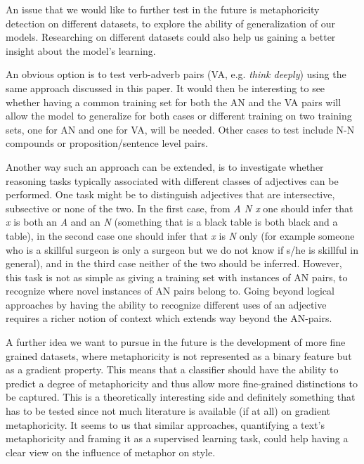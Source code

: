 An issue that we would like to further test in the future is metaphoricity detection on different datasets, to explore the ability of generalization of our models. Researching on different datasets could also help us gaining a better insight about the model's learning.  

An obvious option is to test verb-adverb pairs (VA, e.g. \textit{think deeply}) using the same approach discussed in this paper. It would then be interesting to see whether having a common training set for both the AN and the VA pairs will allow the model to generalize for both cases or different training on two training sets, one for AN and one for VA, will be needed. Other cases to test include N-N compounds or proposition/sentence level pairs. 


Another way such an approach can be extended, is to investigate  whether reasoning tasks typically associated with different classes of adjectives can be performed. One task might be to distinguish adjectives that are intersective, subsective or none of the two. In the first case, from\textit{ A N x} one should infer that \textit{x} is both an \textit{A} and an \textit{N} (something that is a black table is both black and a table), in the second case one should infer that \textit{x} is \textit{N} only (for example someone who is a skillful surgeon is only a surgeon but we do not know if s/he is skillful in general), and in the third case neither of the two should be inferred. 
However, this task is not as simple as giving a training set with instances of AN pairs, to recognize  where novel instances of AN pairs belong to. 
Going beyond logical approaches by having the ability to recognize different uses of an adjective requires a richer notion of context which extends way beyond the AN-pairs. %


A further idea we want to pursue in the future is the development of more fine grained datasets, where metaphoricity is not represented as a binary feature but as a gradient property. This means that a classifier should have the ability to predict a degree of metaphoricity and thus allow more fine-grained distinctions to be captured. This is a theoretically interesting side and definitely something that has to be tested since not much literature is available (if at all) on gradient metaphoricity.  It seems to us that similar approaches, quantifying a text's metaphoricity and framing it as a supervised learning task, could help having a clear view on the influence of metaphor on style. 


\clearpage


